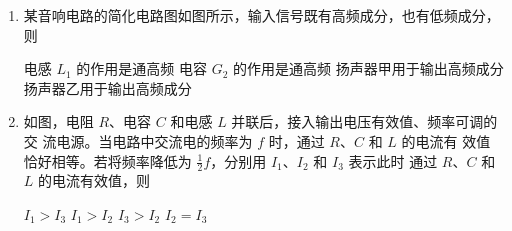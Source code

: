 
\begin{enumerate}
\item
{}
某音响电路的简化电路图如图所示，输入信号既有高频成分，也有低频成分，
则  
\begin{figure}[h!]
\centering

\end{figure}

\fourchoices
{电感 $ L_{1} $ 的作用是通高频}
{电容 $ G_{2} $ 的作用是通高频}
{扬声器甲用于输出高频成分}
{扬声器乙用于输出高频成分}




\item 
{}
如图，电阻 $ R $、电容 $ C $ 和电感 $ L $ 并联后，接入输出电压有效值、频率可调的交
流电源。当电路中交流电的频率为 $ f $ 时，通过 $ R $、$ C $ 和 $ L $ 的电流有
效值恰好相等。若将频率降低为
$ \frac{ 1 }{ 2 } f $，分别用 $ I_{1} $、$ I_{2} $ 和 $ I_{3} $ 表示此时
通过 $ R $、$ C $ 和 $ L $ 的电流有效值，则  
\begin{figure}[h!]
\centering

\end{figure}

\fourchoices
{$ I_{1} > I_{3} $}
{$ I_{1} > I_{2} $}
{$ I_{3} > I_{2} $}
{$ I_{2} = I_{3} $}









\end{enumerate}

